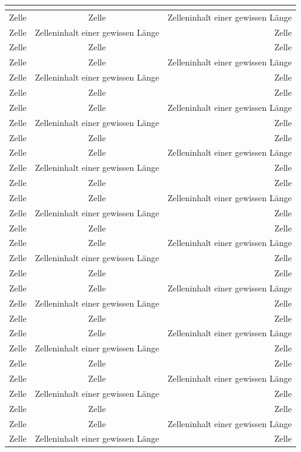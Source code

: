 \documentclass[ngerman]{scrartcl}
\begin{document}
	\begin{longtabu}[l]{@{}lcr@{}}
		\toprule
		\label{tab:tab}\\
		\midrule
		Zelle & Zelle & Zelleninhalt einer gewissen Länge\\
		Zelle & Zelleninhalt einer gewissen Länge & Zelle\\
		Zelle & Zelle & Zelle\\
		Zelle & Zelle & Zelleninhalt einer gewissen Länge\\
		Zelle & Zelleninhalt einer gewissen Länge & Zelle\\
		Zelle & Zelle & Zelle\\
		Zelle & Zelle & Zelleninhalt einer gewissen Länge\\
		Zelle & Zelleninhalt einer gewissen Länge & Zelle\\
		Zelle & Zelle & Zelle\\
		Zelle & Zelle & Zelleninhalt einer gewissen Länge\\
		Zelle & Zelleninhalt einer gewissen Länge & Zelle\\
		Zelle & Zelle & Zelle\\
		Zelle & Zelle & Zelleninhalt einer gewissen Länge\\
		Zelle & Zelleninhalt einer gewissen Länge & Zelle\\
		Zelle & Zelle & Zelle\\
		Zelle & Zelle & Zelleninhalt einer gewissen Länge\\
		Zelle & Zelleninhalt einer gewissen Länge & Zelle\\
		Zelle & Zelle & Zelle\\
		Zelle & Zelle & Zelleninhalt einer gewissen Länge\\
		Zelle & Zelleninhalt einer gewissen Länge & Zelle\\
		Zelle & Zelle & Zelle\\
		Zelle & Zelle & Zelleninhalt einer gewissen Länge\\
		Zelle & Zelleninhalt einer gewissen Länge & Zelle\\
		Zelle & Zelle & Zelle\\
		Zelle & Zelle & Zelleninhalt einer gewissen Länge\\
		Zelle & Zelleninhalt einer gewissen Länge & Zelle\\
		Zelle & Zelle & Zelle\\
		Zelle & Zelle & Zelleninhalt einer gewissen Länge\\
		Zelle & Zelleninhalt einer gewissen Länge & Zelle\\

\end{longtabu}
\end{document}
